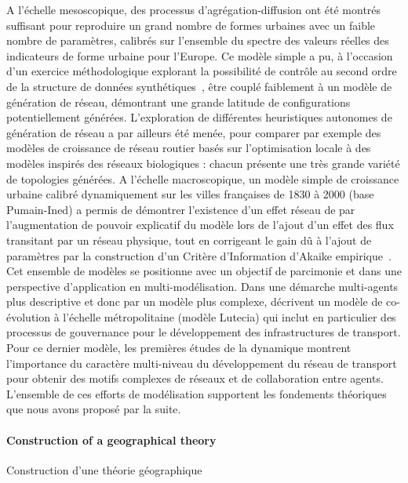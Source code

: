 {A l'échelle mesoscopique, des processus d'agrégation-diffusion ont été montrés suffisant pour reproduire un grand nombre de formes urbaines avec un faible nombre de paramètres, calibrés sur l'ensemble du spectre des valeurs réelles des indicateurs de forme urbaine pour l'Europe. Ce modèle simple a pu, à l'occasion d'un exercice méthodologique explorant la possibilité de contrôle au second ordre de la structure de données synthétiques~\cite{raimbault2016generation}, être couplé faiblement à un modèle de génération de réseau, démontrant une grande latitude de configurations potentiellement générées. L'exploration de différentes heuristiques autonomes de génération de réseau a par ailleurs été menée, pour comparer par exemple des modèles de croissance de réseau routier basés sur l'optimisation locale à des modèles inspirés des réseaux biologiques : chacun présente une très grande variété de topologies générées. A l'échelle macroscopique, un modèle simple de croissance urbaine calibré dynamiquement sur les villes françaises de 1830 à 2000 (base Pumain-Ined) a permis de démontrer l'existence d'un effet réseau de par l'augmentation de pouvoir explicatif du modèle lors de l'ajout d'un effet des flux transitant par un réseau physique, tout en corrigeant le gain dû à l'ajout de paramètres par la construction d'un Critère d'Information d'Akaike empirique~\cite{raimbault2016models}. Cet ensemble de modèles se positionne avec un objectif de parcimonie et dans une perspective d'application en multi-modélisation. Dans une démarche multi-agents plus descriptive et donc par un modèle plus complexe, \cite{le2015modeling} décrivent un modèle de co-évolution à l'échelle métropolitaine (modèle Lutecia) qui inclut en particulier des processus de gouvernance pour le développement des infrastructures de transport. Pour ce dernier modèle, les premières études de la dynamique montrent l'importance du caractère multi-niveau du développement du réseau de transport pour obtenir des motifs complexes de réseaux et de collaboration entre agents. L'ensemble de ces efforts de modélisation supportent les fondements théoriques que nous avons proposé par la suite.
}



\paragraph{Construction of a geographical theory}{Construction d'une théorie géographique}


